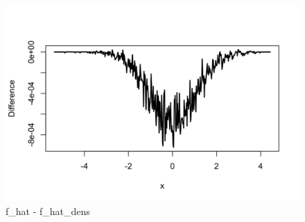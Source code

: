 \begin{frame}[fragile]
\begin{columns}
\begin{column}{0.48\textwidth}
			\begin{figure}[H]
				\centering
				\includegraphics[width=0.7\linewidth]{../images/diff}
				\caption{f\_hat - f\_hat\_dens}
				\label{fig:diff}
			\end{figure}
		\end{column}
	\end{columns}
\end{frame}



%	



